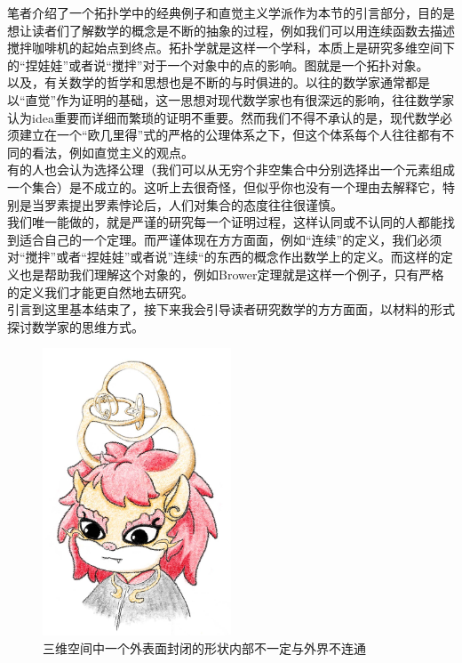 笔者介绍了一个拓扑学中的经典例子和直觉主义学派作为本节的引言部分，目的是想让读者们了解数学的概念是不断的抽象的过程，例如我们可以用连续函数去描述搅拌咖啡机的起始点到终点。拓扑学就是这样一个学科，本质上是研究多维空间下的“捏娃娃”或者说“搅拌”对于一个对象中的点的影响。图就是一个拓扑对象。\\以及，有关数学的哲学和思想也是不断的与时俱进的。以往的数学家通常都是以“直觉”作为证明的基础，这一思想对现代数学家也有很深远的影响，往往数学家认为idea重要而详细而繁琐的证明不重要。然而我们不得不承认的是，现代数学必须建立在一个“欧几里得”式的严格的公理体系之下，但这个体系每个人往往都有不同的看法，例如直觉主义的观点。\\
有的人也会认为选择公理（我们可以从无穷个非空集合中分别选择出一个元素组成一个集合）是不成立的。这听上去很奇怪，但似乎你也没有一个理由去解释它，特别是当罗素提出罗素悖论后，人们对集合的态度往往很谨慎。\\
我们唯一能做的，就是严谨的研究每一个证明过程，这样认同或不认同的人都能找到适合自己的一个定理。而严谨体现在方方面面，例如“连续”的定义，我们必须对“搅拌”或者“捏娃娃”或者说”连续“的东西的概念作出数学上的定义。而这样的定义也是帮助我们理解这个对象的，例如Brower定理就是这样一个例子，只有严格的定义我们才能更自然地去研究。\\
引言到这里基本结束了，接下来我会引导读者研究数学的方方面面，以材料的形式探讨数学家的思维方式。
\begin{figure}[htb]
    \centering
    \includegraphics[width=0.5\textwidth]{麒麟.jpg}
    \caption{三维空间中一个外表面封闭的形状内部不一定与外界不连通}
    \label{麒麟图}
\end{figure}
\newpage